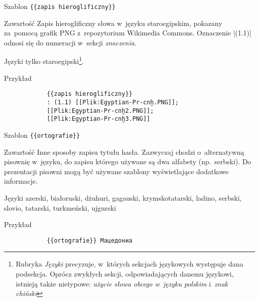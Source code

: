 \begin{opis}
	\item[Szablon] \verb|{{zapis hieroglificzny}}|
	\item[Zawartość] Zapis hieroglificzny słowa w~języku staroegipskim, pokazany za~pomocą grafik PNG z~repozytorium Wikimedia Commons. Oznaczenie \kod|(1.1)| odnosi się do numeracji w~sekcji \emph{znaczenia}.
	\item[Języki] tylko staroegipski\footnote{Rubryka \emph{Języki} precyzuje, w~których sekcjach językowych występuje dana podsekcja. Oprócz zwykłych sekcji, odpowiadających danemu językowi, istnieją także nietypowe: \emph{użycie słowa obcego w~języku polskim} i~\emph{znak chiński}}.
	\item[Przykład]
		\begin{verbatim}
			{{zapis hieroglificzny}}
			: (1.1) [[Plik:Egyptian-Pr-cnḫ.PNG]];
			[[Plik:Egyptian-Pr-cnḫ2.PNG]];
			[[Plik:Egyptian-Pr-cnḫ3.PNG]]
		\end{verbatim}
\end{opis}
\spacer
\begin{opis}
	\item[Szablon] \verb|{{ortografie}}|
	\item[Zawartość] Inne sposoby zapisu tytułu hasła. Zazwyczaj chodzi o~alternatywną pisownię w~języku, do zapisu którego używane są dwa alfabety (np.\ serbski). Do prezentacji pisowni mogą być używane szablony wyświetlające dodatkowe informacje.
	\item[Języki] azerski, białoruski, dżuhuri, gagauski, krymskotatarski, ladino, serbski, slovio, tatarski, turkmeński, ujgurski
	\item[Przykład]
		\begin{verbatim}
			{{ortografie}} Мацедониа
		\end{verbatim}
\end{opis}
\spacer
